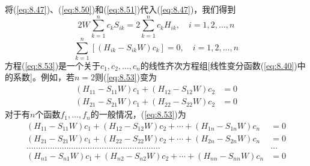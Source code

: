     将(\ref{eq:8.47})、(\ref{eq:8.50})和(\ref{eq:8.51})代入(\ref{eq:8.47})，我们得到
    \begin{equation*}
        2W\sum_{k=1}^{n}c_kS_{ik} = 2\sum_{k=1}^{n}c_kH_{ik}, \quad i = 1,2,\ldots,n
    \end{equation*}
    \begin{equation}
        \sum_{k=1}^{n}\left[\left(H_{ik} - S_{ik}W\right)c_k\right] = 0, \quad i = 1,2,\ldots,n
        \label{eq:8.53}
    \end{equation}
    方程(\ref{eq:8.53})是一个关于$c_1,c_2,\ldots,c_n$的线性齐次方程组[线性变分函数(\ref{eq:8.40})中的系数]。例如，若$n=2$则(\ref{eq:8.53})变为
    \begin{equation}
        \begin{aligned}
            \left(H_{11} - S_{11}W\right)c_1 + \left(H_{12} - S_{12}W\right)c_2 &= 0 \\
            \left(H_{21} - S_{21}W\right)c_1 + \left(H_{22} - S_{22}W\right)c_2 &= 0
        \end{aligned}
        \label{eq:8.54}
    \end{equation}
    对于有$n$个函数$f_1,\ldots,f_n$的一般情况，(\ref{eq:8.53})为
    \begin{equation}
        \boxed{
            \begin{aligned}
                \left(H_{11}-S_{11}W\right)c_1 + \left(H_{12}-S_{12}W\right)c_2 + \cdots + \left(H_{1n}-S_{1n}W\right)c_n &= 0 \\
                \left(H_{21}-S_{21}W\right)c_1 + \left(H_{22}-S_{22}W\right)c_2 + \cdots + \left(H_{2n}-S_{2n}W\right)c_n &= 0 \\
                \ldots\ldots\ldots\ldots\ldots\ldots\ldots\ldots\ldots\ldots\ldots\ldots\ldots\ldots\ldots\ldots\ldots\ldots\ldots & \ldots\\
                \left(H_{n1}-S_{n1}W\right)c_1 + \left(H_{n2}-S_{n2}W\right)c_2 + \cdots + \left(H_{nn}-S_{nn}W\right)c_n &= 0
            \end{aligned}
        }
        \label{eq:8.55}
    \end{equation}

